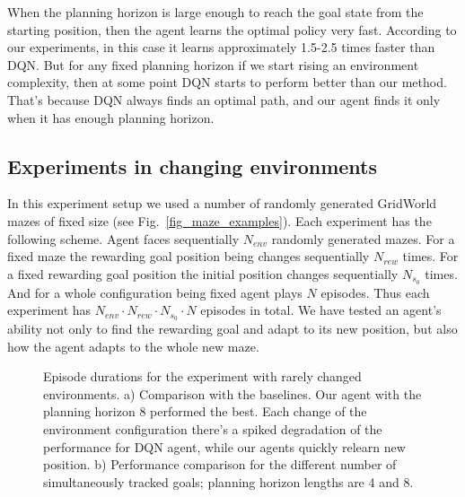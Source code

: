 \documentclass[a4paper,twoside]{article}
\begin{document}
When the planning horizon is large enough to reach the goal state from the starting position, then the agent learns the optimal policy very fast. According to our experiments, in this case it learns approximately 1.5-2.5 times faster than DQN. But for any fixed planning horizon if we start rising an environment complexity, then at some point DQN starts to perform better than our method. That's because DQN always finds an optimal path, and our agent finds it only when it has enough planning horizon.

\subsection{Experiments in changing environments}

In this experiment setup we used a number of randomly generated GridWorld mazes of fixed size (see Fig.~\ref{fig_maze_examples}). Each experiment has the following scheme. Agent faces sequentially $N_{env}$ randomly generated mazes. For a fixed maze the rewarding goal position being changes sequentially $N_{rew}$ times. For a fixed rewarding goal position the initial position changes sequentially $N_{s_0}$ times. And for a whole configuration being fixed agent plays $N$ episodes. Thus each experiment has $N_{env} \cdot N_{rew} \cdot N_{s_0} \cdot N$ episodes in total. We have tested an agent's ability not only to find the rewarding goal and adapt to its new position, but also how the agent adapts to the whole new maze.

\begin{figure}
  \centering
  \begin{minipage}{\linewidth}
    
    \subcaption{}
    \vspace*{10pt}


    
    \subcaption{}

    \vspace*{4pt}
  \end{minipage}
  \caption{Episode durations for the experiment with rarely changed environments. a) Comparison with the baselines. Our agent with the planning horizon 8 performed the best. Each change of the environment configuration there's a spiked degradation of the performance for DQN agent, while our agents quickly relearn new position. b) Performance comparison for the different number of simultaneously tracked goals; planning horizon lengths are 4 and 8.} \label{fig_rare_changes}
\end{figure}
\end{document}
